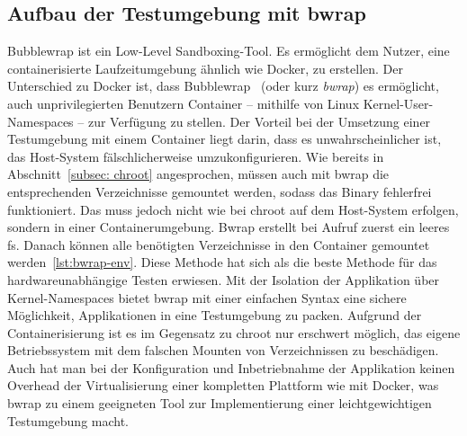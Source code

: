 
\subsection{Aufbau der Testumgebung mit bwrap}\label{subsec: bwrap}
Bubblewrap ist ein Low-Level Sandboxing-Tool.
Es ermöglicht dem Nutzer, eine containerisierte Laufzeitumgebung ähnlich wie Docker, zu erstellen.
Der Unterschied zu Docker ist, dass Bubblewrap~\cite{bwrap} (oder kurz \textit{bwrap}) es ermöglicht, auch unprivilegierten Benutzern
Container -- mithilfe von Linux Kernel-User-Namespaces -- zur Verfügung zu stellen.
Der Vorteil bei der Umsetzung einer Testumgebung mit einem Container liegt darin, dass es unwahrscheinlicher ist,
das Host-System fälschlicherweise umzukonfigurieren.
Wie bereits in Abschnitt~\ref{subsec: chroot} angesprochen, müssen auch mit bwrap die entsprechenden Verzeichnisse gemountet werden,
sodass das Binary fehlerfrei funktioniert.
Das muss jedoch nicht wie bei chroot auf dem Host-System erfolgen, sondern in einer Containerumgebung.
Bwrap erstellt bei Aufruf zuerst ein leeres \gls{fs}.
Danach können alle benötigten Verzeichnisse in den Container gemountet werden~\ref{lst:bwrap-env}.
Diese Methode hat sich als die beste Methode für das hardwareunabhängige Testen erwiesen.
Mit der Isolation der Applikation über Kernel-Namespaces bietet \gls{bwrap} mit einer einfachen Syntax eine sichere Möglichkeit,
Applikationen in eine Testumgebung zu packen.
Aufgrund der Containerisierung ist es im Gegensatz zu chroot nur erschwert möglich, das eigene Betriebssystem mit dem falschen Mounten
von Verzeichnissen zu beschädigen.
Auch hat man bei der Konfiguration und Inbetriebnahme der Applikation keinen Overhead der Virtualisierung einer kompletten Plattform
wie mit Docker, was bwrap zu einem geeigneten Tool zur Implementierung einer leichtgewichtigen Testumgebung macht.